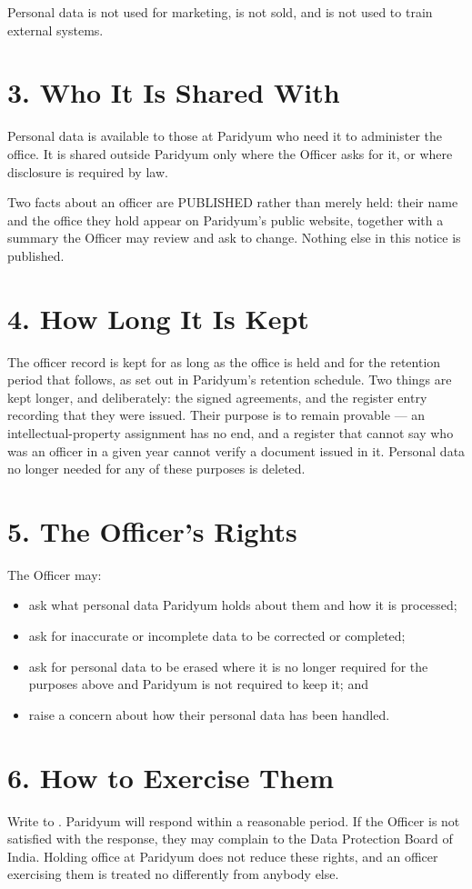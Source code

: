 \documentclass{paridyum}
\begin{document}
Personal data is not used for marketing, is not sold, and is not used to train
external systems.

\section*{3. Who It Is Shared With}
Personal data is available to those at Paridyum who need it to administer the office.
It is shared outside Paridyum only where the Officer asks for it, or where disclosure is
required by law.

Two facts about an officer are PUBLISHED rather than merely held: their name and the
office they hold appear on Paridyum's public website, together with a summary the Officer
may review and ask to change. Nothing else in this notice is published.

\section*{4. How Long It Is Kept}
The officer record is kept for as long as the office is held and for the retention period
that follows, as set out in Paridyum's retention schedule. Two things are kept longer,
and deliberately: the signed agreements, and the register entry recording that they were
issued. Their purpose is to remain provable --- an intellectual-property assignment has no
end, and a register that cannot say who was an officer in a given year cannot verify a
document issued in it. Personal data no longer needed for any of these purposes is
deleted.

\section*{5. The Officer's Rights}
The Officer may:
\begin{itemize}[leftmargin=*, noitemsep]
    \item ask what personal data Paridyum holds about them and how it is processed;
    \item ask for inaccurate or incomplete data to be corrected or completed;
    \item ask for personal data to be erased where it is no longer required for the
          purposes above and Paridyum is not required to keep it; and
    \item raise a concern about how their personal data has been handled.
\end{itemize}

\section*{6. How to Exercise Them}
Write to \textbf{\dkOrgEmail}. Paridyum will respond within a reasonable period. If the
Officer is not satisfied with the response, they may complain to the Data Protection
Board of India. Holding office at Paridyum does not reduce these rights, and an officer
exercising them is treated no differently from anybody else.
\end{document}
